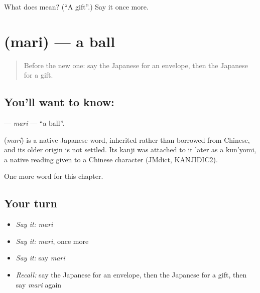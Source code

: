 \begin{tcolorbox}[breakable,colback=teal!4,colframe=teal!35!black,title={Before you move on}]
What does  mean? (\textquotedblleft{}A gift\textquotedblright{}.) Say it once more.
\end{tcolorbox}
\section[\texorpdfstring{\ja{まり} (mari)}{まり (mari)}]{ (mari) — a ball}

\label{lesson:JA-C104-mari}



\begin{quote}
Before the new one: say the Japanese for an envelope, then the Japanese for a gift.
\end{quote}

\subsection*{You'll want to know: }
\textbf{} — \emph{mari} — \textquotedblleft{}a ball\textquotedblright{}.

\begin{cousinweb}
\textbf{} (\emph{mari}) is a native Japanese word, inherited rather than borrowed from Chinese, and its older origin is not settled. Its kanji was attached to it later as a kun'yomi, a native reading given to a Chinese character (JMdict, KANJIDIC2).
\end{cousinweb}

\begin{grammarlens}[title={What you've built}]
One more word for this chapter.
\end{grammarlens}

\subsection*{Your turn}
\begin{itemize}
\raggedright
  \item \emph{Say it:} \emph{mari}
  \item \emph{Say it:} \emph{mari}, once more
  \item \emph{Say it:} say \emph{mari}
  \item \emph{Recall:} say the Japanese for an envelope, then the Japanese for a gift, then say \emph{mari} again
\end{itemize}

